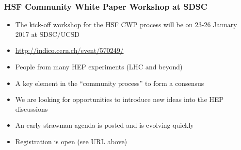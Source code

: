 \begin{frame}
\frametitle{HSF Community White Paper Workshop at SDSC}

\begin{itemize}
\item The kick-off workshop for the HSF CWP process will be on 23-26 January 2017 at SDSC/UCSD
\item \url{http://indico.cern.ch/event/570249/}
\item People from many HEP experiments (LHC and beyond)
\item A key element in the ``community process'' to form a consensus
\item We are looking for opportunities to introduce new ideas into the HEP discussions
\item An early strawman agenda is posted and is evolving quickly
\item Registration is open (see URL above)
\end{itemize}

\end{frame}


